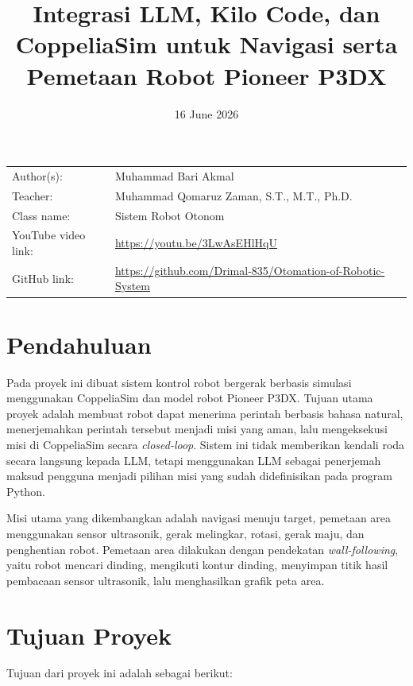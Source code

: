 \documentclass{article}
\title{Integrasi LLM, Kilo Code, dan CoppeliaSim untuk Navigasi serta Pemetaan Robot Pioneer P3DX}
\date{16 June 2026}
\begin{document}
\maketitle

\noindent\begin{tabular}{@{}ll}
    Author(s):          & Muhammad Bari Akmal \\
    Teacher:            & Muhammad Qomaruz Zaman, S.T., M.T., Ph.D. \\
    Class name:         & Sistem Robot Otonom \\
    YouTube video link: & \url{https://youtu.be/3LwAsEHlHqU} \\
    GitHub link:        & \url{https://github.com/Drimal-835/Otomation-of-Robotic-System}
\end{tabular}
\vspace{2cm}

\section{Pendahuluan}

Pada proyek ini dibuat sistem kontrol robot bergerak berbasis simulasi menggunakan CoppeliaSim dan model robot Pioneer P3DX. Tujuan utama proyek adalah membuat robot dapat menerima perintah berbasis bahasa natural, menerjemahkan perintah tersebut menjadi misi yang aman, lalu mengeksekusi misi di CoppeliaSim secara \textit{closed-loop}. Sistem ini tidak memberikan kendali roda secara langsung kepada LLM, tetapi menggunakan LLM sebagai penerjemah maksud pengguna menjadi pilihan misi yang sudah didefinisikan pada program Python.

Misi utama yang dikembangkan adalah navigasi menuju target, pemetaan area menggunakan sensor ultrasonik, gerak melingkar, rotasi, gerak maju, dan penghentian robot. Pemetaan area dilakukan dengan pendekatan \textit{wall-following}, yaitu robot mencari dinding, mengikuti kontur dinding, menyimpan titik hasil pembacaan sensor ultrasonik, lalu menghasilkan grafik peta area.

\section{Tujuan Proyek}

Tujuan dari proyek ini adalah sebagai berikut:
\end{document}
